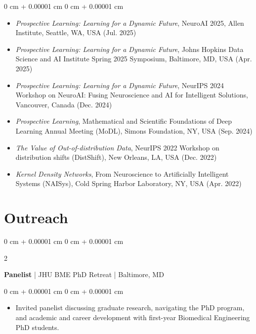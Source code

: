 \documentclass[10pt, letterpaper]{article}
\newenvironment{highlights}{
    \begin{itemize}[
        topsep=0.10 cm,
        parsep=0.10 cm,
        partopsep=0pt,
        itemsep=0pt,
        leftmargin=0 cm + 10pt
    ]
}{
    \end{itemize}
} %
\newenvironment{onecolentry}{
    \begin{adjustwidth}{
        0 cm + 0.00001 cm
    }{
        0 cm + 0.00001 cm
    }
}{
    \end{adjustwidth}
} %
\newenvironment{twocolentry}[2][]{
    \onecolentry
    \def\secondColumn{#2}
    \setcolumnwidth{\fill, 4.5 cm}
    \begin{paracol}{2}
}{
    \switchcolumn \raggedleft \secondColumn\strut
    \end{paracol}
    \endonecolentry
} %
\begin{document}
    \begin{onecolentry}
        \begin{highlights}
            \item \textit{Prospective Learning: Learning for a Dynamic Future}, NeuroAI 2025, Allen Institute, Seattle, WA, USA (Jul. 2025)
            \item \textit{Prospective Learning: Learning for a Dynamic Future}, Johns Hopkins Data Science and AI Institute Spring 2025 Symposium, Baltimore, MD, USA (Apr. 2025)
            \item \textit{Prospective Learning: Learning for a Dynamic Future}, NeurIPS 2024 Workshop on NeuroAI: Fusing Neuroscience and AI for Intelligent Solutions, Vancouver, Canada (Dec. 2024)
            \item \textit{Prospective Learning}, Mathematical and Scientific Foundations of Deep Learning Annual Meeting (MoDL), Simons Foundation, NY, USA (Sep. 2024)
            \item \textit{The Value of Out-of-distribution Data}, NeurIPS 2022 Workshop on distribution shifts (DistShift), New Orleans, LA, USA (Dec. 2022)
            \item \textit{Kernel Density Networks}, From Neuroscience to Artificially Intelligent Systems (NAISys), Cold Spring Harbor Laboratory, NY, USA (Apr. 2022)
        \end{highlights}
    \end{onecolentry}


    \section{Outreach}

    \vspace{0.2 cm}

    \begin{twocolentry}{2026}
    \textbf{Panelist} | JHU BME PhD Retreat | Baltimore, MD
    \end{twocolentry}
    \vspace{0.10 cm}
    \begin{onecolentry}
        \begin{highlights}
            \item Invited panelist discussing graduate research, navigating the PhD program, and academic and career development with first-year Biomedical Engineering PhD students.
        \end{highlights}
    \end{onecolentry}
\end{document}
